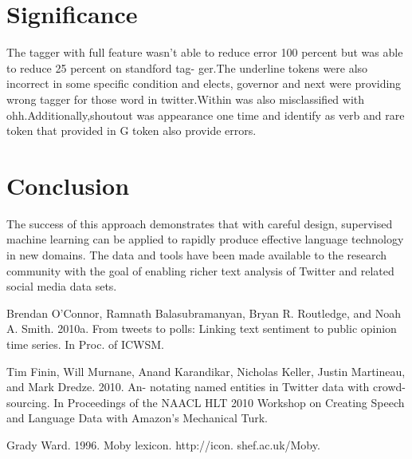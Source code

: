 \documentclass[journal, a4paper]{IEEEtran}
\begin{document}
\section{Significance}

	The tagger with full feature wasn’t able to reduce error 100 percent but was able to reduce 25 percent on standford tag- ger.The underline tokens were also incorrect in some specific condition and elects, governor and next were providing wrong tagger for those word in twitter.Within was also misclassified with ohh.Additionally,shoutout was appearance one time and identify as verb and rare token that provided in G token also provide errors.

\section{Conclusion}
	The success of this approach demonstrates that with careful design, supervised machine learning can be applied to rapidly produce effective language technology in new domains. The data and tools have been made available to the research community with the goal of enabling richer text analysis of Twitter and related social media data sets.


\begin{thebibliography}{5}

	Brendan O’Connor, Ramnath Balasubramanyan, Bryan R. Routledge, and Noah A. Smith. 2010a. From tweets to polls: Linking text sentiment to public opinion time series. In Proc. of ICWSM.

	Tim Finin, Will Murnane, Anand Karandikar, Nicholas Keller, Justin Martineau, and Mark Dredze. 2010. An- notating named entities in Twitter data with crowd- sourcing. In Proceedings of the NAACL HLT 2010 Workshop on Creating Speech and Language Data with Amazon’s Mechanical Turk.

	Grady Ward. 1996. Moby lexicon. http://icon. shef.ac.uk/Moby.

\end{thebibliography}
\end{document}
